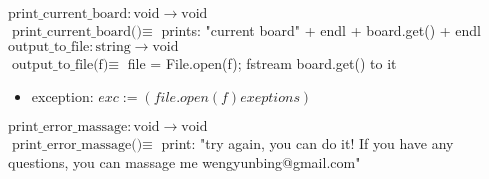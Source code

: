 \documentclass[12pt]{article}
\begin{document}
\noindent $\text{print\_current\_board} : \text{void} \rightarrow \text{void}$\\
\noindent $\text{print\_current\_board()} \equiv $ prints: "current board" + endl + board.get() + endl\\


\noindent $\text{output\_to\_file} : \text{string} \rightarrow \text{void}$\\
\noindent $\text{output\_to\_file(f)} \equiv $ file = File.open(f); fstream board.get() to it
\begin{itemize}
\item exception: $exc := (file.open(f) exeptions)$
\end{itemize}

\noindent $\text{print\_error\_massage} : \text{void} \rightarrow \text{void}$\\
\noindent $\text{print\_error\_massage()} \equiv $ print: "try again, you can do it! If you have any questions, you can massage me wengyunbing@gmail.com"
\end{document}
